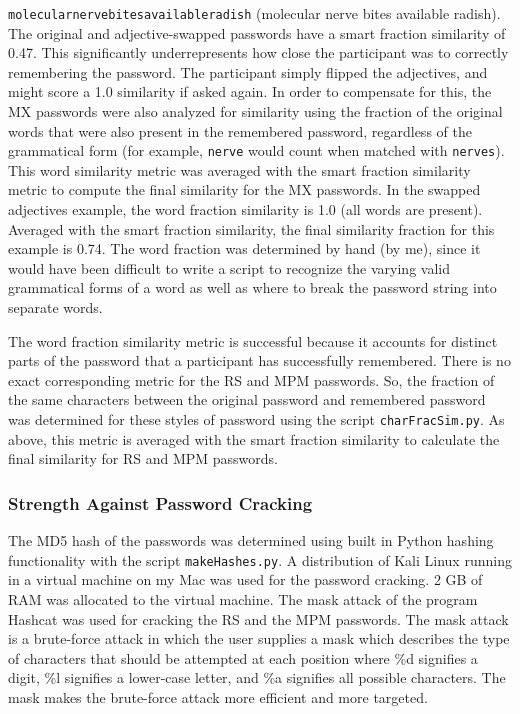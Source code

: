 \documentclass{article}
\begin{document}
\noindent \texttt{molecularnervebitesavailableradish} (molecular nerve bites available radish). \\

The original and adjective-swapped passwords have a smart fraction similarity of 0.47. This significantly underrepresents how close the participant was to correctly remembering the password. The participant simply flipped the adjectives, and might score a 1.0 similarity if asked again. In order to compensate for this, the MX passwords were also analyzed for similarity using the fraction of the original words that were also present in the remembered password, regardless of the grammatical form (for example, \texttt{nerve} would count when matched with \texttt{nerves}). This word similarity metric was averaged with the smart fraction similarity metric to compute the final similarity for the MX passwords. In the swapped adjectives example, the word fraction similarity is 1.0 (all words are present). Averaged with the smart fraction similarity, the final similarity fraction for this example is 0.74. The word fraction was determined by hand (by me), since it would have been difficult to write a script to recognize the varying valid grammatical forms of a word as well as where to break the password string into separate words.

The word fraction similarity metric is successful because it accounts for distinct parts of the password that a participant has successfully remembered. There is no exact corresponding metric for the RS and MPM passwords. So, the fraction of the same characters between the original password and remembered password was determined for these styles of password using the script \texttt{charFracSim.py}. As above, this metric is averaged with the smart fraction similarity to calculate the final similarity for RS and MPM passwords.


\subsubsection*{Strength Against Password Cracking}
The MD5 hash of the passwords was determined using built in Python hashing functionality with the script \texttt{makeHashes.py}. A distribution of Kali Linux running in a virtual machine on my Mac was used for the password cracking. 2 GB of RAM was allocated to the virtual machine. The mask attack of the program Hashcat \cite{hashcat} was used for cracking the RS and the MPM passwords. The mask attack is a brute-force attack in which the user supplies a mask which describes the type of characters that should be attempted at each position where \%d signifies a digit, \%l signifies a lower-case letter, and \%a signifies all possible characters. The mask makes the brute-force attack more efficient and more targeted.
\end{document}
